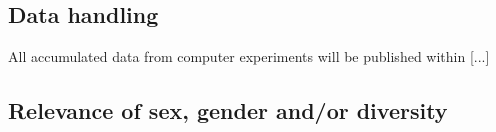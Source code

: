 \documentclass[a4paper,11pt]{article} %
\begin{document}

\subsection{Data handling}

All accumulated data from computer experiments will be published within [...]


\subsection{Relevance of sex, gender and/or diversity}
\end{document}
